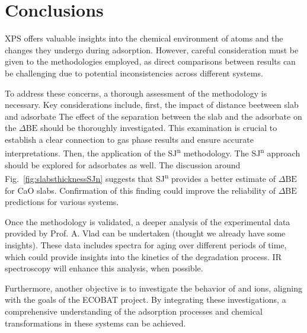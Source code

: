 \documentclass[journal=jpccck,manuscript=article]{achemso}
\def\dbe{\ensuremath{\Delta\text{BE}}}
\begin{document}
\clearpage
\section{Conclusions}
XPS offers valuable insights into the chemical environment of atoms and the changes they undergo during adsorption. However, careful consideration must be given to the methodologies employed, as direct comparisons between results can be challenging due to potential inconsistencies across different systems.

To address these concerns, a thorough assessment of the methodology is necessary. Key considerations include, first, the impact of distance beetween slab and adsorbate The effect of the separation between the slab and the adsorbate on the \dbe{} should be thoroughly investigated. This examination is crucial to establish a clear connection to gas phase results and ensure accurate interpretations.
Then, the application of the SJ\textsuperscript{n} methodology. The SJ\textsuperscript{n} approach should be explored for adsorbates as well. The discussion around Fig.~\ref{fig:slabsthicknessSJn} suggests that SJ\textsuperscript{n} provides a better estimate of \dbe{} for CaO slabs. Confirmation of this finding could improve the reliability of \dbe{} predictions for various systems.

Once the methodology is validated, a deeper analysis of the experimental data provided by Prof. A. Vlad can be undertaken (thought we already have some insights). These data includes spectra for aging over different periods of time, which could provide insights into the kinetics of the degradation process. IR spectroscopy will enhance this analysis, when possible.

Furthermore, another objective is to investigate the behavior of  and  ions, aligning with the goals of the ECOBAT project. By integrating these investigations, a comprehensive understanding of the adsorption processes and chemical transformations in these systems can be achieved.


\clearpage

	
\end{document}
